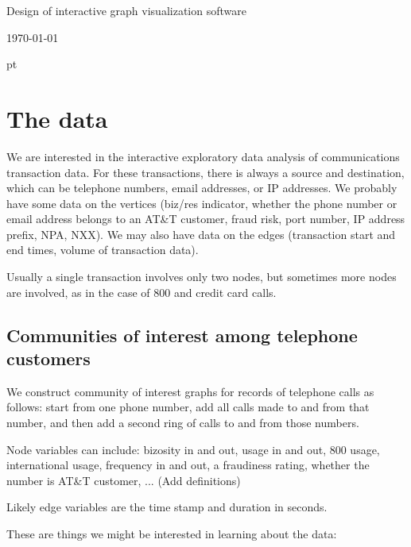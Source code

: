 \documentclass[11pt]{article}
\begin{document}
\begin{center}
\LARGE{ Design of interactive graph visualization software }
\end{center}
\centerline {\today}

\parindent 0in
 pt

\section {The data}

We are interested in the interactive exploratory data analysis of
communications transaction data.  For these transactions, there
is always a source and destination, which can be telephone
numbers, email addresses, or IP addresses.  We probably have some
data on the vertices (biz/res indicator, whether the phone
number or email address belongs to an AT\&T customer, fraud risk,
port number, IP address prefix, NPA, NXX).  We may also have data
on the edges (transaction start and end times, volume of
transaction data).

Usually a single transaction involves only two nodes, but
sometimes more nodes are involved, as in the case of 800 and
credit card calls.

\subsection {Communities of interest among telephone customers}

We construct community of interest graphs for records of
telephone calls as follows:  start from one phone number, add all
calls made to and from that number, and then add a second ring of
calls to and from those numbers.

Node variables can include: bizosity in and out, usage in and out,
800 usage, international usage, frequency in and out, a fraudiness
rating, whether the number is AT\&T customer,  ...  (Add definitions)

Likely edge variables are the time stamp and duration in seconds.

These are things we might be interested in learning about the data:
\end{document}
